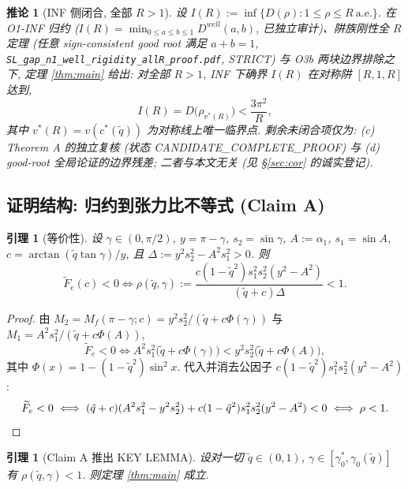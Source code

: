 \documentclass[UTF8]{ctexart}
\newtheorem{lemma}[theorem]{引理}
\newtheorem{corollary}[theorem]{推论}
\begin{document}
\begin{corollary}[INF 侧闭合, 全部 $R>1$]\label{cor:inf}
设 $I(R):=\inf\{D(\rho):1\le\rho\le R\ \text{a.e.}\}$. 在 O1-INF 归约
($I(R)=\min_{0\le a\le b\le1}D^{well}(a,b)$, 已独立审计)、阱族刚性全 $R$
定理 (任意 sign-consistent good root 满足 $a+b=1$, \texttt{SL\_gap\_n1\_well\_\allowbreak rigidity\_allR\_proof.pdf},
STRICT) 与 O3b 两块边界排除之下, 定理 \ref{thm:main} 给出: 对全部 $R>1$,
INF 下确界 $I(R)$ 在对称阱 $[R,1,R]$ 达到,
\begin{equation}
	I(R)=D\bigl(\rho_{v^*(R)}\bigr)<\frac{3\pi^2}{R},
\end{equation}
其中 $v^*(R)=v(c^*(\tilde q))$ 为对称线上唯一临界点. 剩余未闭合项仅为:
(c) Theorem A 的独立复核 (状态 CANDIDATE\_\allowbreak COMPLETE\_\allowbreak PROOF) 与 (d) good-root
全局论证的边界残差; 二者与本文无关 (见 \S\ref{sec:cor} 的诚实登记).
\end{corollary}

\subsection{证明结构: 归约到张力比不等式 (Claim A)}

\begin{lemma}[等价性]\label{lem:equiv}
设 $\gamma\in(0,\pi/2)$, $y=\pi-\gamma$, $s_2=\sin\gamma$,
$A:=\alpha_1$, $s_1=\sin A$, $c=\arctan(\tilde q\tan\gamma)/y$, 且
$\Delta:=y^2s_2^2-A^2s_1^2>0$. 则
\begin{equation}
	\widetilde F_e(c)<0
	\iff
	\rho(\tilde q,\gamma):=
	\frac{c(1-\tilde q^2)s_1^2s_2^2(y^2-A^2)}{(\tilde q+c)\Delta}<1.
	\label{eq:rho}
\end{equation}
\end{lemma}

\begin{proof}
由 $M_2=M_f(\pi-\gamma;c)=y^2s_2^2/(\tilde q+c\Phi(\gamma))$ 与
$M_1=A^2s_1^2/(\tilde q+c\Phi(A))$,
\begin{equation*}
	\widetilde F_e<0
	\iff A^2s_1^2\bigl(\tilde q+c\Phi(\gamma)\bigr)<y^2s_2^2\bigl(\tilde q+c\Phi(A)\bigr),
\end{equation*}
其中 $\Phi(x)=1-(1-\tilde q^2)\sin^2x$. 代入并消去公因子
$c(1-\tilde q^2)s_1^2s_2^2(y^2-A^2)$:
\begin{equation*}
	\widetilde F_e<0
	\iff (\tilde q+c)(A^2s_1^2-y^2s_2^2)+c(1-\tilde q^2)s_1^2s_2^2(y^2-A^2)<0
	\iff \rho<1.
	\qedhere
\end{equation*}
\end{proof}

\begin{lemma}[Claim A 推出 KEY LEMMA]\label{lem:claimAtoKL}
设对一切 $\tilde q\in(0,1)$, $\gamma\in[\gamma_0^*,\gamma_0(\tilde q)]$ 有
$\rho(\tilde q,\gamma)<1$. 则定理 \ref{thm:main} 成立.
\end{lemma}
\end{document}
